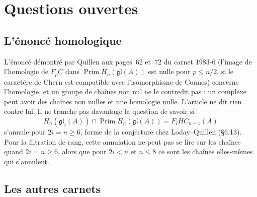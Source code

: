 \documentclass[11pt,a4paper]{amsart}
\theoremstyle{definition}
\theoremstyle{plain}
\theoremstyle{remark}
\newcommand{\gl}{\mathfrak{gl}}
\newcommand{\Prim}{\operatorname{Prim}}
\begin{document}
\section{Questions ouvertes}

\subsection{L'énoncé homologique}

L'énoncé démontré par Quillen aux pages~62 et~72 du carnet 1983-6 (l'image de l'homologie de $F_p C$ dans $\Prim H_n(\gl(A))$ est nulle pour $p \le n/2$, si le caractère de Chern est compatible avec l'isomorphisme de Connes) concerne l'homologie, et un groupe de chaînes non nul ne le contredit pas : un complexe peut avoir des chaînes non nulles et une homologie nulle. L'article ne dit rien contre lui. Il ne tranche pas davantage la question de savoir si
\[
H_n(\gl_i(A)) \cap \Prim H_n(\gl(A)) = F_i HC_{n-1}(A)
\]
s'annule pour $2i = n \ge 6$, forme de la conjecture chez Loday--Quillen (\S6.13). Pour la filtration de rang, cette annulation ne peut pas se lire sur les chaînes quand $2i = n \ge 6$, alors que pour $2i < n$ et $n \le 8$ ce sont les chaînes elles-mêmes qui s'annulent.

\subsection{Les autres carnets}
\end{document}
